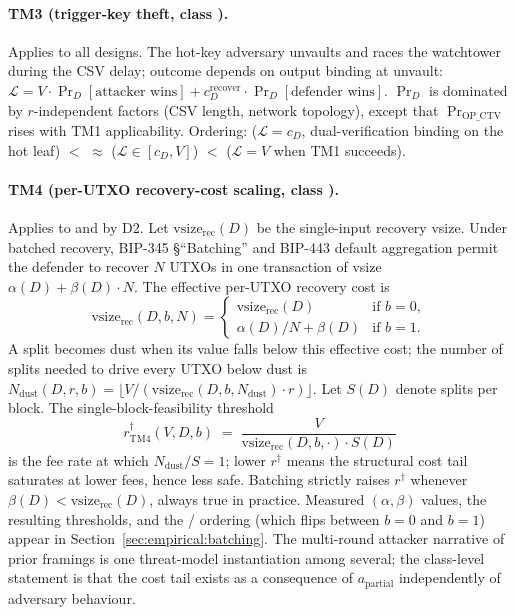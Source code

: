 \paragraph{TM3 (trigger-key theft, class \classhot{}).}
Applies to all designs. The hot-key adversary unvaults and races
the watchtower during the CSV delay; outcome depends on output
binding at unvault:
$\mathcal{L} = V \cdot \Pr_D[\text{attacker wins}] +
c_D^{\text{recover}} \cdot \Pr_D[\text{defender wins}]$. $\Pr_D$ is
dominated by $r$-independent factors (CSV length, network
topology), except that $\Pr_{\mathrm{OP\_CTV}}$ rises with TM1
applicability. Ordering: \catcsfs{} ($\mathcal{L} = c_D$,
dual-verification binding on the hot leaf) $<$ \opvault{} $\approx$
\opccv{} ($\mathcal{L} \in [c_D, V]$) $<$ \opctv{} ($\mathcal{L} = V$ when
TM1 succeeds).

\paragraph{TM4 (per-UTXO recovery-cost scaling, class \classscale{}).}\label{sec:sens:tm4}
Applies to \opccv{} and \opvault{} by D2. Let $\text{vsize}_{\text{rec}}(D)$
be the single-input recovery vsize. Under batched recovery, BIP-345
§``Batching'' and BIP-443 default aggregation permit the defender
to recover $N$ UTXOs in one transaction of vsize
$\alpha(D) + \beta(D) \cdot N$. The effective per-UTXO recovery
cost is
\begin{equation}
  \text{vsize}_{\text{rec}}(D, b, N) =
  \begin{cases}
    \text{vsize}_{\text{rec}}(D)                             & \text{if } b = 0, \\
    \alpha(D)/N + \beta(D)                                   & \text{if } b = 1.
  \end{cases}
\end{equation}
A split becomes dust when its value falls below this effective
cost; the number of splits needed to drive every UTXO below dust
is $N_{\text{dust}}(D, r, b) = \lfloor V /
(\text{vsize}_{\text{rec}}(D, b, N_{\text{dust}}) \cdot r) \rfloor$.
Let $S(D)$ denote splits per block. The single-block-feasibility
threshold
\begin{equation} \label{eq:r-dagger}
  r^\dagger_{\mathrm{TM4}}(V, D, b)
  \;=\; \frac{V}{\text{vsize}_{\text{rec}}(D, b, \cdot) \cdot S(D)}
\end{equation}
is the fee rate at which $N_{\text{dust}}/S = 1$; lower
$r^\dagger$ means the structural cost tail saturates at lower fees,
hence less safe. Batching strictly raises $r^\dagger$ whenever
$\beta(D) < \text{vsize}_{\text{rec}}(D)$, always true in practice.
Measured $(\alpha, \beta)$ values, the resulting thresholds, and
the \opccv{}/\opvault{} ordering (which flips between $b = 0$ and
$b = 1$) appear in Section~\ref{sec:empirical:batching}. The
multi-round attacker narrative of prior framings is one
threat-model instantiation among several; the class-level statement
is that the cost tail exists as a consequence of $a_{\text{partial}}$
independently of adversary behaviour.

